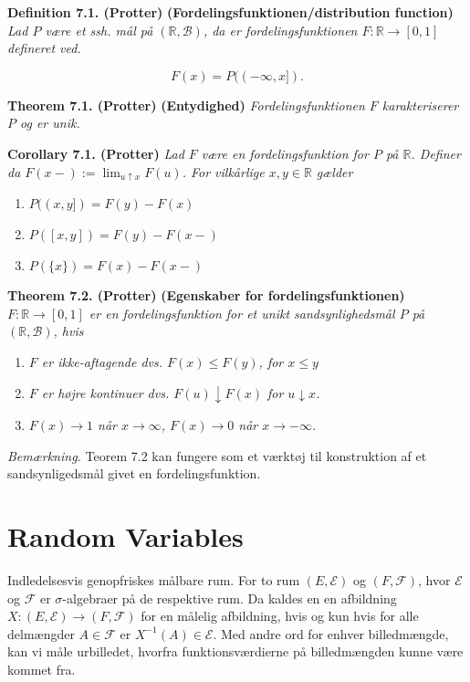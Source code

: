 \documentclass[a4paper,12pt,openany]{book}
\providecommand{\tightlist}{%
 \setlength{\itemsep}{0pt}\setlength{\parskip}{0pt}}
\begin{document}
\textbf{Definition 7.1. (Protter)} \textbf{(Fordelingsfunktionen/distribution function)} \emph{Lad \(P\) være et ssh. mål på \((\mathbb{R},\mathcal{B})\), da er fordelingsfunktionen \(F : \mathbb{R}\to [0,1]\) defineret ved.}

\[
F(x)=P((-\infty,x]).
\]

\textbf{Theorem 7.1. (Protter)} \textbf{(Entydighed)} \emph{Fordelingsfunktionen \(F\) karakteriserer \(P\) og er unik.}

\textbf{Corollary 7.1. (Protter)} \emph{Lad \(F\) være en fordelingsfunktion for \(P\) på \(\mathbb{R}\). Definer da \(F(x-):=\lim_{u\uparrow x}F(u)\). For vilkårlige \(x,y\in\mathbb{R}\) gælder}

\begin{enumerate}
\def\labelenumi{\roman{enumi}.}
\tightlist
\item
  \(P((x,y])=F(y)-F(x)\)
\item
  \(P([x,y])=F(y)-F(x-)\)
\item
  \(P(\{x\})=F(x)-F(x-)\)
\end{enumerate}

\textbf{Theorem 7.2. (Protter)} \textbf{(Egenskaber for fordelingsfunktionen)} \emph{\(F : \mathbb{R} \to [0,1]\) er en fordelingsfunktion for et unikt sandsynlighedsmål \(P\) på \((\mathbb{R},\mathcal{B})\), hvis}

\begin{enumerate}
\def\labelenumi{\roman{enumi}.}
\tightlist
\item
  \emph{\(F\) er ikke-aftagende dvs. \(F(x)\le F(y)\), for \(x\le y\)}
\item
  \emph{\(F\) er højre kontinuer dvs. \(F(u)\downarrow F(x)\) for \(u\downarrow x\).}
\item
  \emph{\(F(x)\to 1\) når \(x\to \infty\), \(F(x)\to 0\) når \(x\to -\infty\).}
\end{enumerate}

\emph{Bemærkning.} Teorem 7.2 kan fungere som et værktøj til konstruktion af et sandsynligedsmål givet en fordelingsfunktion.

\hypertarget{random-variables}{%
\section{Random Variables}\label{random-variables}}

Indledelsesvis genopfriskes målbare rum. For to rum \((E,\mathcal{E})\) og \((F,\mathcal{F})\), hvor \(\mathcal{E}\) og \(\mathcal{F}\) er \(\sigma\)-algebraer på de respektive rum. Da kaldes en en afbildning \(X : (E,\mathcal{E})\to(F,\mathcal{F})\) for en målelig afbildning, hvis og kun hvis for alle delmængder \(A\in\mathcal{F}\) er \(X^{-1}(A)\in\mathcal{E}\). Med andre ord for enhver billedmængde, kan vi måle urbilledet, hvorfra funktionsværdierne på billedmængden kunne være kommet fra.
\end{document}
